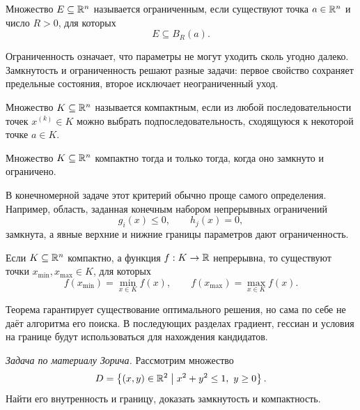 \begin{definition}
Множество \(E\subseteq\mathbb{R}^n\) называется ограниченным, если существуют точка \(a\in\mathbb{R}^n\) и число \(R>0\), для которых
\[
E\subseteq B_R(a).
\]
\end{definition}

Ограниченность означает, что параметры не могут уходить сколь угодно далеко. Замкнутость и ограниченность решают разные задачи: первое свойство сохраняет предельные состояния, второе исключает неограниченный уход.

\begin{definition}
Множество \(K\subseteq\mathbb{R}^n\) называется компактным, если из любой последовательности точек \(x^{(k)}\in K\) можно выбрать подпоследовательность, сходящуюся к некоторой точке \(a\in K\).
\end{definition}

\begin{theorem}
Множество \(K\subseteq\mathbb{R}^n\) компактно тогда и только тогда, когда оно замкнуто и ограничено.
\end{theorem}

В конечномерной задаче этот критерий обычно проще самого определения. Например, область, заданная конечным набором непрерывных ограничений
\[
g_i(x)\leq0,
\qquad
h_j(x)=0,
\]
замкнута, а явные верхние и нижние границы параметров дают ограниченность.

\begin{theorem}[Вейерштрасс]
Если \(K\subseteq\mathbb{R}^n\) компактно, а функция \(f:K\to\mathbb{R}\) непрерывна, то существуют точки \(x_{\min},x_{\max}\in K\), для которых
\[
f(x_{\min})
=
\min_{x\in K}f(x),
\qquad
f(x_{\max})
=
\max_{x\in K}f(x).
\]
\end{theorem}

Теорема гарантирует существование оптимального решения, но сама по себе не даёт алгоритма его поиска. В последующих разделах градиент, гессиан и условия на границе будут использоваться для нахождения кандидатов.

\begin{problem}
\textit{Задача по материалу Зорича.}
Рассмотрим множество
\[
D=
\left\{(x,y)\in\mathbb{R}^2
\;\middle|\;
 x^2+y^2\leq1,
\ y\geq0
\right\}.
\]
Найти его внутренность и границу, доказать замкнутость и компактность.
\end{problem}

